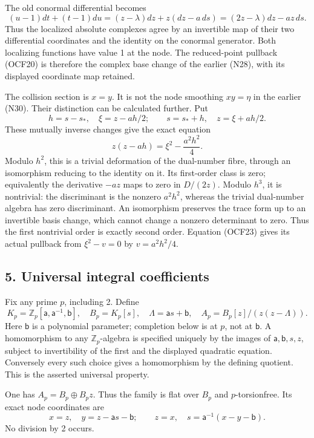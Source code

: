 \documentclass[
]{article}
\begin{document}
The old conormal differential becomes \[
(u-1)dt+(t-1)du
=(z-\lambda)dz+z(dz-a\,ds)
=(2z-\lambda)dz-az\,ds.
\] Thus the localized absolute complexes agree by an invertible map of
their two differential coordinates and the identity on the conormal
generator. Both localizing functions have value 1 at the node. The
reduced-point pullback (OCF20) is therefore the complex base change of
the earlier (N28), with its displayed coordinate map retained.

The collision section is \(x=y\). It is not the node smoothing
\(xy=\eta\) in the earlier (N30). Their distinction can be calculated
further. Put \[
h=s-s_*,\quad \xi=z-ah/2;
\qquad s=s_*+h,\quad z=\xi+ah/2.
\] These mutually inverse changes give the exact equation \[
z(z-ah)=\xi^2-\frac{a^2h^2}{4}.
\tag{OCF23}
\] Modulo \(h^2\), this is a trivial deformation of the dual-number
fibre, through an isomorphism reducing to the identity on it. Its
first-order class is zero; equivalently the derivative \(-az\) maps to
zero in \(D/(2z)\). Modulo \(h^3\), it is nontrivial: the discriminant
is the nonzero \(a^2h^2\), whereas the trivial dual-number algebra has
zero discriminant. An isomorphism preserves the trace form up to an
invertible basis change, which cannot change a nonzero determinant to
zero. Thus the first nontrivial order is exactly second order. Equation
(OCF23) gives its actual pullback from \(\xi^2-v=0\) by \(v=a^2h^2/4\).

\subsection{5. Universal integral
coefficients}\label{universal-integral-coefficients}

Fix any prime \(p\), including 2. Define \[
K_p=\mathbb Z_p[\mathsf a,\mathsf a^{-1},\mathsf b],\quad
B_p=K_p[s],\quad \Lambda=\mathsf a s+\mathsf b,\quad
A_p=B_p[z]/(z(z-\Lambda)).
\tag{OIF1}
\] Here \(\mathsf b\) is a polynomial parameter; completion below is at
\(p\), not at \(\mathsf b\). A homomorphism to any
\(\mathbb Z_p\)-algebra is specified uniquely by the images of
\(\mathsf a,\mathsf b,s,z\), subject to invertibility of the first and
the displayed quadratic equation. Conversely every such choice gives a
homomorphism by the defining quotient. This is the asserted universal
property.

One has \(A_p=B_p\oplus B_pz\). Thus the family is flat over \(B_p\) and
\(p\)-torsionfree. Its exact node coordinates are \[
x=z,\quad y=z-\mathsf a s-\mathsf b;
\qquad z=x,\quad s=\mathsf a^{-1}(x-y-\mathsf b).
\tag{OIF2}
\] No division by 2 occurs.
\end{document}
